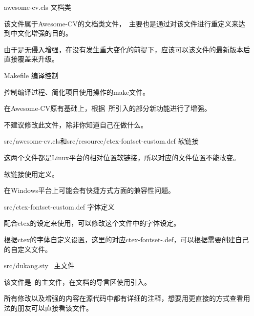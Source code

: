 \begin{cventries}
\cventry
  {awesome-cv.cls}
  {文档类}
  {}
  {}
  {
    \begin{cvitems}
      \item {该文件属于Awesome-CV的文档类文件，\dk~主要也是通过对该文件进行重定义来达到中文化增强的目的。}
      \item {由于是无侵入增强，在没有发生重大变化的前提下，应该可以该文件的最新版本后直接覆盖来升级。}
    \end{cvitems}
  }
\cventry
  {Makefile}
  {编译控制}
  {}
  {}
  {
    \begin{cvitems}
      \item {控制编译过程、简化项目使用操作的make文件。}
      \item {在Awesome-CV原有基础上，根据\dk~所引入的部分新功能进行了增强。}
      \item {\color{awesome}不建议修改此文件，除非你知道自己在做什么。}
    \end{cvitems}
  }
\cventry
  {src/awesome-cv.cls和src/resource/ctex-fontset-custom.def}
  {软链接}
  {}
  {}
  {
    \begin{cvitems}
      \item {这两个文件都是Linux平台的相对位置软链接，所以对应的文件位置不能改变。}
      \item {软链接使用定义。}
      \item {在Windows平台上可能会有快捷方式方面的兼容性问题。}
    \end{cvitems}
  }
\cventry
  {src/ctex-fontset-custom.def}
  {字体定义}
  {}
  {}
  {
    \begin{cvitems}
      \item {配合ctex的设定来使用，可以修改这个文件中的字体设定。}
      \item {根据ctex的字体自定义设置，这里的对应ctex-fontset-.def，可以根据需要创建自己的自定义文件。}
    \end{cvitems}
  }
\cventry
  {src/dukang.sty}
  {\dk~主文件}
  {}
  {}
  {
    \begin{cvitems}
      \item {该文件是\dk~的主文件，在文档的导言区使用引入。}
      \item {所有修改以及增强的内容在源代码中都有详细的注释，想要用更直接的方式查看用法的朋友可以直接看该文件。}
    \end{cvitems}
  }

\end{cventries}
